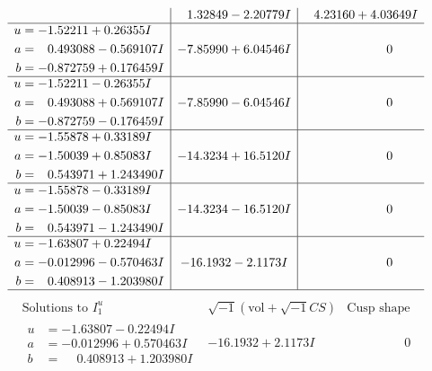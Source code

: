 \documentclass[1p]{elsarticle_modified}
\theoremstyle{definition}
\newcommand{\I}{\sqrt{-1}}
\begin{document}
$$\begin{array}{c|c|c}
 & \phantom{-}1.32849 - 2.20779 I & \phantom{-}4.23160 + 4.03649 I \\ \hline\begin{aligned}
u &= -1.52211 + 0.26355 I \\
a &= \phantom{-}0.493088 - 0.569107 I \\
b &= -0.872759 + 0.176459 I\end{aligned}
 & -7.85990 + 6.04546 I & \phantom{-0.000000 } 0 \\ \hline\begin{aligned}
u &= -1.52211 - 0.26355 I \\
a &= \phantom{-}0.493088 + 0.569107 I \\
b &= -0.872759 - 0.176459 I\end{aligned}
 & -7.85990 - 6.04546 I & \phantom{-0.000000 } 0 \\ \hline\begin{aligned}
u &= -1.55878 + 0.33189 I \\
a &= -1.50039 + 0.85083 I \\
b &= \phantom{-}0.543971 + 1.243490 I\end{aligned}
 & -14.3234 + 16.5120 I & \phantom{-0.000000 } 0 \\ \hline\begin{aligned}
u &= -1.55878 - 0.33189 I \\
a &= -1.50039 - 0.85083 I \\
b &= \phantom{-}0.543971 - 1.243490 I\end{aligned}
 & -14.3234 - 16.5120 I & \phantom{-0.000000 } 0 \\ \hline\begin{aligned}
u &= -1.63807 + 0.22494 I \\
a &= -0.012996 - 0.570463 I \\
b &= \phantom{-}0.408913 - 1.203980 I\end{aligned}
 & -16.1932 - 2.1173 I & \phantom{-0.000000 } 0\\
 \hline 
 \end{array}$$\newpage$$\begin{array}{c|c|c}  
\text{Solutions to }I^u_{1}& \I (\text{vol} + \sqrt{-1}CS) & \text{Cusp shape}\\
 \hline 
\begin{aligned}
u &= -1.63807 - 0.22494 I \\
a &= -0.012996 + 0.570463 I \\
b &= \phantom{-}0.408913 + 1.203980 I\end{aligned}
 & -16.1932 + 2.1173 I & \phantom{-0.000000 } 0 \\ \hline\begin{aligned}

\end{aligned}
\end{array}$$
\end{document}
